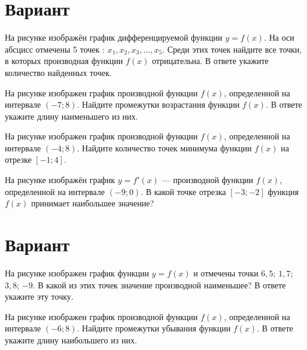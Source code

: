 
\newpage\section{Вариант}\begin{taskBN}{1}
На рисунке изображён график дифференцируемой функции $y=f(x)$. На оси абсцисс отмечены 5 точек : $x_1, x_2, x_3, \dots, x_5$. Среди этих точек найдите все точки, в которых производная функции $f(x)$ отрицательна. В ответе укажите количество найденных точек.
\end{taskBN}

\begin{taskBN}{2}
На рисунке изображен график производной функции $f(x)$, определенной на интервале $(-7;8)$. Найдите промежутки возрастания функции $f(x)$. В ответе укажите длину наименьшего из них.
\end{taskBN}

\begin{taskBN}{3}
На рисунке изображен график производной функции $f(x)$, определенной на интервале $(-4;8)$. Найдите количество точек минимума функции $f(x)$ на отрезке $[-1;4]$. 
\end{taskBN}

\begin{taskBN}{4}
На рисунке изображён график $y=f'(x)$ — производной функции $f(x)$, определенной на интервале $(-9;0)$. В какой точке отрезка $[-3; -2]$ функция $f(x)$ принимает наибольшее значение?
\end{taskBN}

\newpage\section{Вариант}\begin{taskBN}{1}
На рисунке изображен график функции $y=f(x)$ и отмечены точки $6,5$; $1,7$; $3,8$; $-9$. В какой из этих точек значение производной наименьшее? В ответе укажите эту точку. 
\end{taskBN}

\begin{taskBN}{2}
На рисунке изображен график производной функции $f(x)$, определенной на интервале $(-6;8)$. Найдите промежутки убывания функции $f(x)$. В ответе укажите длину наибольшего из них.
\end{taskBN}

